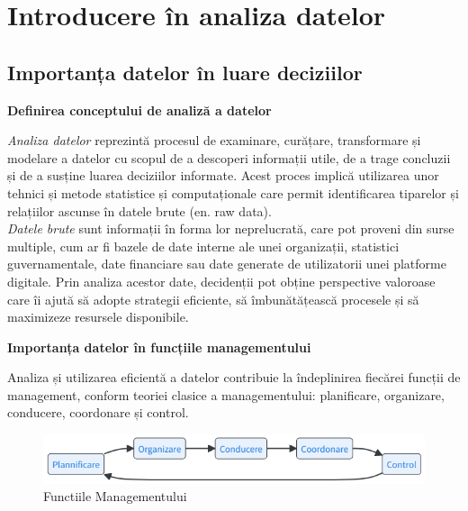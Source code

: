 \documentclass[
  11pt,
  b5paper,
  nottoc]{book}
\begin{document}

\chapter{Introducere în analiza datelor}\label{cap1}

\section{Importanța datelor în luare
deciziilor}\label{importanux21ba-datelor-uxeen-luare-deciziilor}

\textbf{Definirea conceptului de analiză a datelor}

\emph{Analiza datelor} reprezintă procesul de examinare, curățare,
transformare și modelare a datelor cu scopul de a descoperi informații
utile, de a trage concluzii și de a susține luarea deciziilor informate.
Acest proces implică utilizarea unor tehnici și metode statistice și
computaționale care permit identificarea tiparelor și relațiilor ascunse
în datele brute (en. raw data).\\
\emph{Datele brute} sunt informații în forma lor neprelucrată, care pot
proveni din surse multiple, cum ar fi bazele de date interne ale unei
organizații, statistici guvernamentale, date financiare sau date
generate de utilizatorii unei platforme digitale. Prin analiza acestor
date, decidenții pot obține perspective valoroase care îi ajută să
adopte strategii eficiente, să îmbunătățească procesele și să maximizeze
resursele disponibile.

\textbf{Importanța datelor în funcțiile managementului}

Analiza și utilizarea eficientă a datelor contribuie la îndeplinirea
fiecărei funcții de management, conform teoriei clasice a
managementului: planificare, organizare, conducere, coordonare și
control.

\begin{figure}[H]

{\centering \includegraphics{images/functii_management.png}

}

\caption{Functiile Managementului}

\end{figure}%
\end{document}
